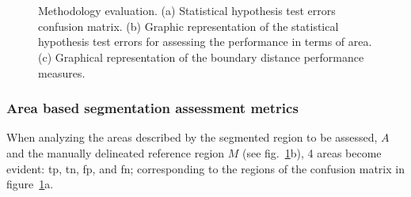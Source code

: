 \documentclass[authoryear,preprint,review,12pt]{elsarticle}
\begin{document}
\begin{figure}[Htbp]
{
}%
\\
~
\caption[Methodology evaluation.]{ Methodology evaluation. (a) Statistical hypothesis test errors confusion matrix. (b) 
Graphic representation of the statistical hypothesis test errors for assessing the performance in terms of area. (c) Graphical representation of the boundary distance performance measures.}
\label{fig:gtEval}
\end{figure}

\subsubsection{Area based segmentation assessment metrics}

When analyzing the areas described by the segmented region  to be assessed, $A$ and the manually delineated reference region $M$ (see fig.~\ref{fig:gtEval}b), 4 areas become evident: \acf{tp},  \acf{tn},  \acf{fp},  and \acf{fn}; corresponding to the regions of the confusion matrix in figure~\ref{fig:gtEval}a.
\end{document}
